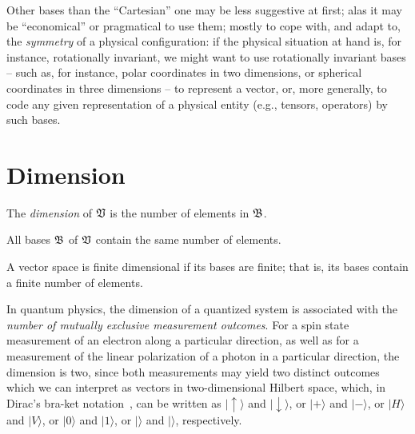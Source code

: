 Other bases than the ``Cartesian'' one may be less suggestive at first; alas it may be ``economical'' or pragmatical to use them;
mostly to cope with, and adapt to, the {\em symmetry} of a physical configuration:
if the physical situation at hand is, for instance, rotationally invariant,
we might want to use rotationally invariant bases --
such as, for instance, polar coordinates in two dimensions, or spherical coordinates in three dimensions --
to represent a vector, or, more generally, to code any given representation of a physical entity
(e.g., tensors, operators) by such bases.


\section{Dimension}
The {\em dimension}
of $\frak V$ is the number of elements in $\frak B$.

All bases $\frak B$ of $\frak V$ contain the same number of elements.

A vector space is finite dimensional if its bases are finite; that is, its bases
contain a finite number of elements.

{\color{Purple}
In quantum physics, the dimension of a quantized system is associated with
the {\em number of mutually exclusive measurement outcomes}.
For a spin state measurement of an electron
along a particular direction,
as well as for a measurement of the linear polarization
of a photon in a particular direction,
the dimension is two, since both measurements
may yield two distinct outcomes
which we can
interpret as vectors in two-dimensional Hilbert space,
which, in Dirac's bra-ket notation~\cite{dirac}, can be written as
$
\vert \uparrow \rangle$ and $\vert \downarrow \rangle$,
or $\vert + \rangle$ and $
\vert - \rangle
$,
or
$
\vert H \rangle $ and $
\vert V \rangle
$,
or
$
\vert 0 \rangle $ and $
\vert 1 \rangle
$,
or
$
\bigg|$\raisebox{-0.4\height}{\begin{tikzpicture}
    \emoticon\pupils
    \draw[very thick,red,line cap=round] (-1ex,-1ex)
               ..controls (-0.5ex,-1.5ex)and(0.5ex,-1.5ex)..(1ex,-1ex);
    \draw (0.60ex,1.20ex)--(0.60ex,1.60ex)
          (0.85ex,1.25ex)--(0.95ex,1.45ex)
          (1.00ex,1.00ex)--(1.20ex,1.10ex)
          (0.35ex,1.15ex)--(0.25ex,1.35ex)
          (-0.60ex,1.20ex)--(-0.60ex,1.60ex)
          (-0.85ex,1.25ex)--(-0.95ex,1.45ex)
          (-1.00ex,1.00ex)--(-1.20ex,1.10ex)
          (-0.35ex,1.15ex)--(-0.25ex,1.35ex);
\end{tikzpicture}}$\bigg\rangle $ and $
\bigg|$\raisebox{-0.4\height}{\begin{tikzpicture}
\emoticon\pupils
    \fill[shift={( 0.5ex,0.5ex)},rotate=90] (0,0) ellipse (0.3ex and 0.15ex);
    \fill[shift={(-0.5ex,0.5ex)},rotate=90] (0,0) ellipse (0.3ex and 0.15ex);
    \draw[thick] (-1ex,-1ex)..controls
        (-0.5ex,-0.5ex)and(0.5ex,-0.5ex)..(1ex,-1ex);
    \draw[thick] (0.2ex,1.15ex)--(0.5ex,1.6ex)(-0.2ex,1.15ex)--(-0.5ex,1.6ex);
\end{tikzpicture}}$\bigg\rangle
$,
respectively.
}

